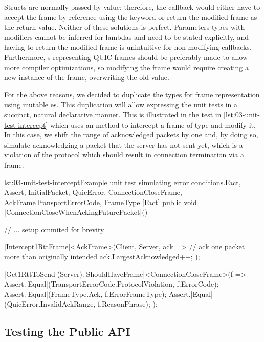 Structs are normally passed by value; therefore, the callback would either have to accept the frame
by reference using the  keyword or return the modified frame as the return value.
Neither of these solutions is perfect. Parameters types with  modifiers cannot be
inferred for lambdas and need to be stated explicitly, and having to return the modified frame is
unintuitive for non-modifying callbacks. Furthermore, s representing QUIC frames
should be preferably made  to allow more compiler optimizations, so modifying the
frame would require creating a new instance of the frame, overwriting the old value.

For the above reasons, we decided to duplicate the types for frame representation using mutable
es. This duplication will allow expressing the unit tests in a succinct, natural
declarative manner. This is illustrated in the test in \autoref{lst:03-unit-test-intercept} which
uses an  method to intercept a frame of type
 and modify it. In this case, we shift the range of acknowledged packets by one and,
by doing so, simulate acknowledging a packet that the server has not sent yet, which is a violation
of the protocol which should result in connection termination via a \CONNECTIONCLOSE{} frame.

\begin{myListingCsharpNoPageBreak}{lst:03-unit-test-intercept}{Example unit test simulating error conditions.}{Fact, Assert, InitialPacket, QuicError, ConnectionCloseFrame, AckFrame}{TransportErrorCode, FrameType}
    [Fact]
    public void |ConnectionCloseWhenAckingFuturePacket|()
    {
        // ... setup ommited for brevity

        |Intercept1RttFrame|<AckFrame>(Client, Server, ack =>
        {
            // ack one packet more than originally intended
            ack.LargestAcknowledged++;
        });

        |Get1RttToSend|(Server).|ShouldHaveFrame|<ConnectionCloseFrame>(f =>
        {
            Assert.|Equal|(TransportErrorCode.ProtocolViolation, f.ErrorCode);
            Assert.|Equal|(FrameType.Ack, f.ErrorFrameType);
            Assert.|Equal|(QuicError.InvalidAckRange, f.ReasonPhrase);
        });
    }
\end{myListingCsharpNoPageBreak}

\subsection{Testing the Public API}

